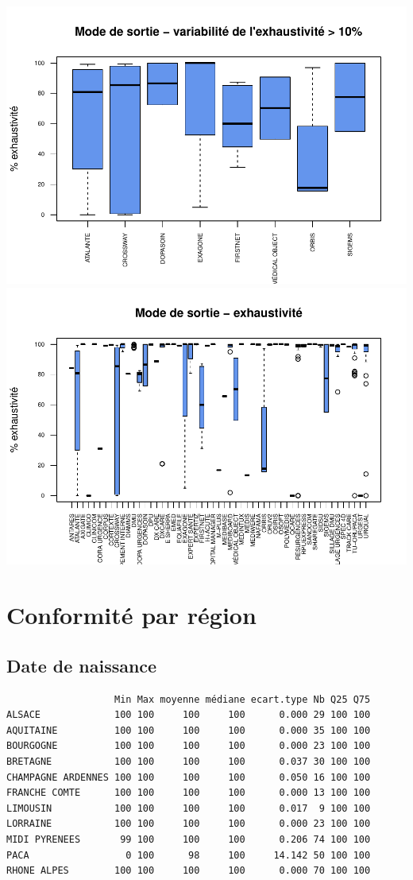 \documentclass[]{article}
\begin{document}
\includegraphics{septembre2015_files/figure-latex/unnamed-chunk-31-1.pdf}
\includegraphics{septembre2015_files/figure-latex/unnamed-chunk-31-2.pdf}

\section{Conformité par région}\label{conformite-par-region}

\subsection{Date de naissance}\label{date-de-naissance-1}

\begin{verbatim}
                   Min Max moyenne médiane ecart.type Nb Q25 Q75
ALSACE             100 100     100     100      0.000 29 100 100
AQUITAINE          100 100     100     100      0.000 35 100 100
BOURGOGNE          100 100     100     100      0.000 23 100 100
BRETAGNE           100 100     100     100      0.037 30 100 100
CHAMPAGNE ARDENNES 100 100     100     100      0.050 16 100 100
FRANCHE COMTE      100 100     100     100      0.000 13 100 100
LIMOUSIN           100 100     100     100      0.017  9 100 100
LORRAINE           100 100     100     100      0.000 23 100 100
MIDI PYRENEES       99 100     100     100      0.206 74 100 100
PACA                 0 100      98     100     14.142 50 100 100
RHONE ALPES        100 100     100     100      0.000 70 100 100
\end{verbatim}
\end{document}
